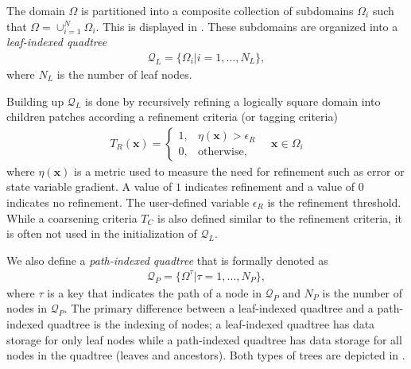 The domain $\Omega$ is partitioned into a composite collection of subdomains $\Omega_i$ such that $\Omega = \cup_{i = 1}^{N} \Omega_i$. This is displayed in . These subdomains are organized into a {\em leaf-indexed quadtree}
\begin{align}
    \mathcal{Q}_L = \{\Omega_i | i = 1, \dots, N_L\},
    \label{eq:leaf-indexed-quadtree}
\end{align}
where $N_L$ is the number of leaf nodes.  Building up $\mathcal{Q}_L$ is done by recursively refining a logically square domain into children patches according a refinement criteria (or tagging criteria)
\begin{align}
    T_{R} (\textbf{x}) =
    \begin{cases}
        1,& \eta(\textbf{x}) > \epsilon_{R} \\
        0,& \text{otherwise},
    \end{cases}
    \quad \textbf{x} \in \Omega_i
\end{align}
where $\eta(\textbf{x})$ is a metric used to measure the need for refinement such as error or state variable gradient. A value of $1$ indicates refinement and a value of $0$ indicates no refinement. The user-defined variable $\epsilon_{R}$ is the refinement threshold. While a coarsening criteria $T_{C}$ is also defined similar to the refinement criteria, it is often not used in the initialization of $\mathcal{Q}_L$.

We also define a {\em path-indexed quadtree} that is formally denoted as
\begin{align}
    \mathcal{Q}_P = \{\Omega^{\tau} | \tau = 1, \dots, N_P\},
    \label{eq:path-indexed-quadtree}
\end{align}
where $\tau$ is a key that indicates the path of a node in $\mathcal{Q}_P$ and $N_P$ is the number of nodes in $\mathcal{Q}_P$. The primary difference between a leaf-indexed quadtree and a path-indexed quadtree is the indexing of nodes; a leaf-indexed quadtree has data storage for only leaf nodes while a path-indexed quadtree has data storage for all nodes in the quadtree (leaves and ancestors). Both types of trees are depicted in .

